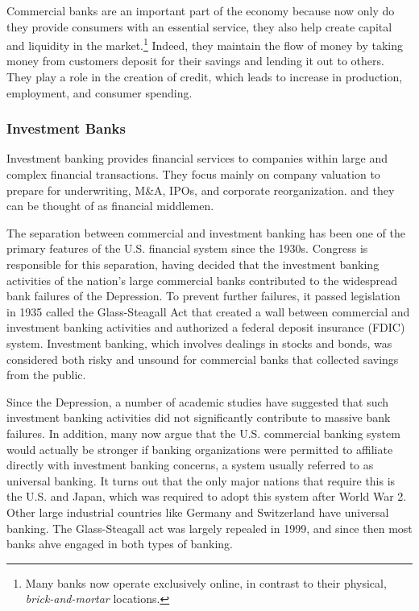 \documentclass{article}
\begin{document}
    Commercial banks are an important part of the economy because now only do they provide consumers with an essential service, they also help create capital and liquidity in the market.\footnote{Many banks now operate exclusively online, in contrast to their physical, \textit{brick-and-mortar} locations.} Indeed, they maintain the flow of money by taking money from customers deposit for their savings and lending it out to others. They play a role in the creation of credit, which leads to increase in production, employment, and consumer spending. 

    \subsubsection{Investment Banks}

      Investment banking provides financial services to companies within large and complex financial transactions. They focus mainly on company valuation to prepare for underwriting, M\&A, IPOs, and corporate reorganization. and they can be thought of as financial middlemen. 

      The separation between commercial and investment banking has been one of the primary features of the U.S. financial system since the 1930s. Congress is responsible for this separation, having decided that the investment banking activities of the nation's large commercial banks contributed to the widespread bank failures of the Depression. To prevent further failures, it passed legislation in 1935 called the Glass-Steagall Act that created a wall between commercial and investment banking activities and authorized a federal deposit insurance (FDIC) system. Investment banking, which involves dealings in stocks and bonds, was considered both risky and unsound for commercial banks that collected savings from the public.

      Since the Depression, a number of academic studies have suggested that such investment banking activities did not significantly contribute to massive bank failures. In addition, many now argue that the U.S. commercial banking system would actually be stronger if banking organizations were permitted to affiliate directly with investment banking concerns, a system usually referred to as universal banking. It turns out that the only major nations that require this is the U.S. and Japan, which was required to adopt this system after World War 2. Other large industrial countries like Germany and Switzerland have universal banking. The Glass-Steagall act was largely repealed in 1999, and since then most banks ahve engaged in both types of banking. 
\end{document}
